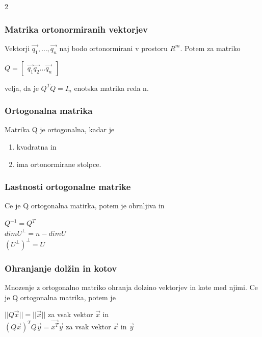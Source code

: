 \documentclass{article}
\begin{document}
\begin{multicols}{2}
	\subsubsection{Matrika ortonormiranih vektorjev}

	Vektorji $\vec{q_{1}}, \dots, \vec{q_{n}}$ naj bodo ortonormirani v prostoru $R^{m}$. Potem
	za matriko
	\begin{center}
		$Q = \begin{bmatrix}
				\vec{q_{1}} \vec{q_{2}} \dots \vec{q_{n}}
			\end{bmatrix}$
	\end{center}
	velja, da je $Q^{T}Q = I_{n}$ enotska matrika reda n.

	\subsubsection{Ortogonalna matrika}

	Matrika Q je ortogonalna, kadar je
	\begin{enumerate}
		\item kvadratna in
		\item ima ortonormirane stolpce.
	\end{enumerate}

	\subsubsection{Lastnosti ortogonalne matrike}

	Ce je Q ortogonalna matirka, potem je obrnljiva in
	\begin{center}
		$Q^{-1} = Q^{T}$\\
		$dimU^{\perp} = n - dimU$\\
		$(U^{\perp})^{\perp} = U$
	\end{center}

	\subsubsection{Ohranjanje dolžin in kotov}

	Mnozenje z ortogonalno matriko ohranja dolzino vektorjev in kote med njimi. Ce je Q
	ortogonalna matrika, potem je
	\begin{center}
		$|| Q \vec{x} || = || \vec{x} ||$ za vsak vektor $\vec{x}$ in\\
		$(Q\vec{x})^{T}Q\vec{y} = \vec{x^{T}} \vec{y}$ za vsak vektor $\vec{x}$ in $\vec{y}$
	\end{center}


\end{multicols}
\end{document}
